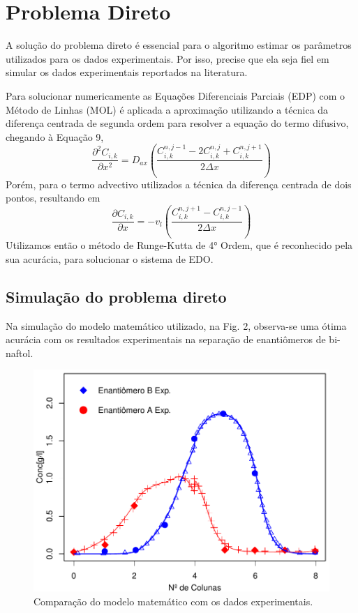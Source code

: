 \documentclass[por]{Template_SBEF}
\begin{document}
\section{Problema Direto}
A solução do problema direto é essencial para o algoritmo estimar os parâmetros utilizados para os dados experimentais. Por isso, precise que ela seja fiel em simular os dados experimentais reportados na literatura.

Para solucionar numericamente as Equações Diferenciais Parciais (EDP) com o Método de Linhas (MOL) é aplicada a aproximação utilizando a técnica da diferença centrada de segunda ordem para resolver a equação do termo difusivo, chegando à Equação 9,
\begin{equation}
\frac{\partial^2 C_{i,k}}{\partial x^2} = D_{ax}(\frac{C_{i,k}^{n,j-1} - 2C_{i,k}^{n,j} + C_{i,k}^{n,j+1}}{2\Delta x})
\end{equation}
Porém, para o termo advectivo utilizados a técnica da diferença centrada de dois pontos, resultando em
\begin{equation}
\frac{\partial C_{i,k}}{\partial x} = - v_l (\frac{C_{i,k}^{n,j+1} - C_{i,k}^{n,j-1}}{2\Delta x})
\end{equation}
Utilizamos então o método de Runge-Kutta de 4° Ordem, que é reconhecido pela sua acurácia, para solucionar o sistema de EDO.

\subsection{Simulação do problema direto}
Na simulação do modelo matemático utilizado, na Fig. 2, observa-se uma ótima acurácia com os resultados experimentais na separação de enantiômeros de bi-naftol.
\begin{figure}[H] 
	\centering
	\includegraphics[width=.8\columnwidth]{Arquivos/problema.pdf} 
	\caption{Comparação do modelo matemático com os dados experimentais.} 
\end{figure}
\end{document}
